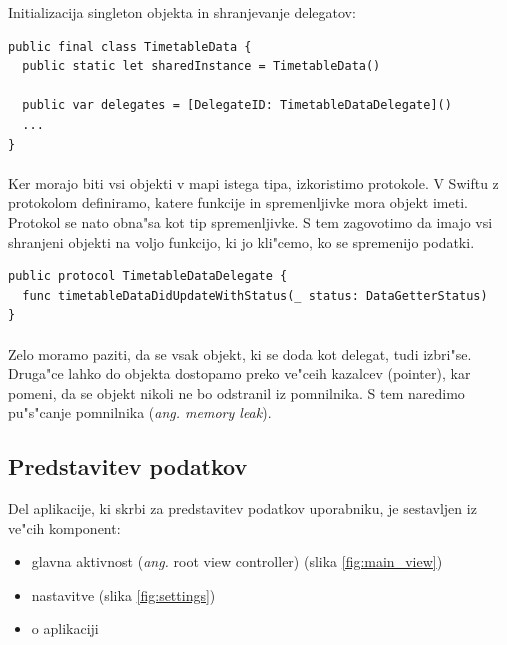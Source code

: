 \begin{center}
	Initializacija singleton objekta in shranjevanje delegatov:
\end{center}
\begin{verbatim}
public final class TimetableData {
  public static let sharedInstance = TimetableData()
	
  public var delegates = [DelegateID: TimetableDataDelegate]()
  ...
}
\end{verbatim}

\paragraph{}
Ker morajo biti vsi objekti v mapi istega tipa, izkoristimo protokole. V Swiftu z protokolom definiramo, katere funkcije in spremenljivke mora objekt imeti. Protokol se nato obna"sa kot tip spremenljivke. S tem zagovotimo da imajo vsi shranjeni objekti na voljo funkcijo, ki jo kli"cemo, ko se spremenijo podatki.

\begin{verbatim}
public protocol TimetableDataDelegate {
  func timetableDataDidUpdateWithStatus(_ status: DataGetterStatus)
}
\end{verbatim}

\paragraph{}
Zelo moramo paziti, da se vsak objekt, ki se doda kot delegat, tudi izbri"se. Druga"ce lahko do objekta dostopamo preko ve"ceih kazalcev (pointer), kar pomeni, da se objekt nikoli ne bo odstranil iz pomnilnika. S tem naredimo pu"s"canje pomnilnika (\textit{ang. memory leak}).

\subsection{Predstavitev podatkov}
Del aplikacije, ki skrbi za predstavitev podatkov uporabniku, je sestavljen iz ve"cih komponent:
\begin{itemize}
	\setlength\itemsep{0em}
	\item glavna aktivnost (\textit{ang.} root view controller) (slika \ref{fig:main_view})
	\item nastavitve (slika \ref{fig:settings})
	\item o aplikaciji
\end{itemize}

